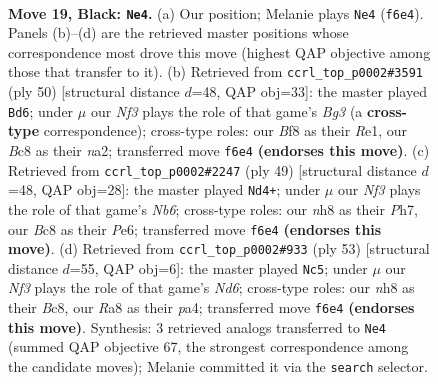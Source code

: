 \documentclass[11pt]{article}
\begin{document}
\clearpage

\begin{figure}[p]\centering
\begin{subfigure}{0.46\textwidth}\centering
\resizebox{\linewidth}{!}{%
\newchessgame
\chessboard[
  setfen={r1b2b1N/2k4p/2p1pnp1/2P5/Pp3P1P/4P3/8/RNB3K1 b - a3 0 19},
  showmover=false,
  pgfstyle=straightmove, color=movearrow, markmove={f6-e4}
]}
\caption{}
\end{subfigure}\hfill
\begin{subfigure}{0.46\textwidth}\centering
\resizebox{\linewidth}{!}{%
\newchessgame
\chessboard[
  setfen={2r3k1/p6p/1p3b2/6p1/N1P1p1P1/1P4B1/n4PP1/4R1K1 w - - 0 26},
  showmover=false,
  pgfstyle=straightmove, color=movearrow, markmove={g3-d6}
]}
\caption{}
\end{subfigure}
\\[4pt]
\begin{subfigure}{0.46\textwidth}\centering
\resizebox{\linewidth}{!}{%
\newchessgame
\chessboard[
  setfen={2r3k1/5ppp/1p2p3/7P/2P5/PnN2b2/1PK2P1P/5BR1 b - - 8 25},
  showmover=false,
  pgfstyle=straightmove, color=movearrow, markmove={b3-d4}
]}
\caption{}
\end{subfigure}\hfill
\begin{subfigure}{0.46\textwidth}\centering
\resizebox{\linewidth}{!}{%
\newchessgame
\chessboard[
  setfen={2b2bk1/7p/p2p2p1/3Pp3/P1P1N2P/2Rn1P2/6P1/5K2 b - - 4 27},
  showmover=false,
  pgfstyle=straightmove, color=movearrow, markmove={d3-c5}
]}
\caption{}
\end{subfigure}
\caption{\textbf{Move 19, Black: \texttt{Ne4}.} (a) Our position; Melanie plays \texttt{Ne4} (\texttt{f6e4}). Panels (b)--(d) are the retrieved master positions whose correspondence most drove this move (highest QAP objective among those that transfer to it). (b) Retrieved from \texttt{ccrl\_top\_p0002\#3591} (ply 50) [structural distance $d$=48, QAP obj=33]: the master played \texttt{Bd6}; under $\mu$ our \emph{Nf3} plays the role of that game's \emph{Bg3} (a \textbf{cross-type} correspondence); cross-type roles: our \emph{B}f8 as their \emph{R}e1, our \emph{B}c8 as their \emph{n}a2; transferred move \texttt{f6e4} \textbf{(endorses this move)}. (c) Retrieved from \texttt{ccrl\_top\_p0002\#2247} (ply 49) [structural distance $d$=48, QAP obj=28]: the master played \texttt{Nd4+}; under $\mu$ our \emph{Nf3} plays the role of that game's \emph{Nb6}; cross-type roles: our \emph{n}h8 as their \emph{P}h7, our \emph{B}c8 as their \emph{P}e6; transferred move \texttt{f6e4} \textbf{(endorses this move)}. (d) Retrieved from \texttt{ccrl\_top\_p0002\#933} (ply 53) [structural distance $d$=55, QAP obj=6]: the master played \texttt{Nc5}; under $\mu$ our \emph{Nf3} plays the role of that game's \emph{Nd6}; cross-type roles: our \emph{n}h8 as their \emph{B}c8, our \emph{R}a8 as their \emph{p}a4; transferred move \texttt{f6e4} \textbf{(endorses this move)}. Synthesis: 3 retrieved analogs transferred to \texttt{Ne4} (summed QAP objective 67, the strongest correspondence among the candidate moves); Melanie committed it via the \texttt{search} selector.}
\label{fig:thought-m37}
\end{figure}
\end{document}
